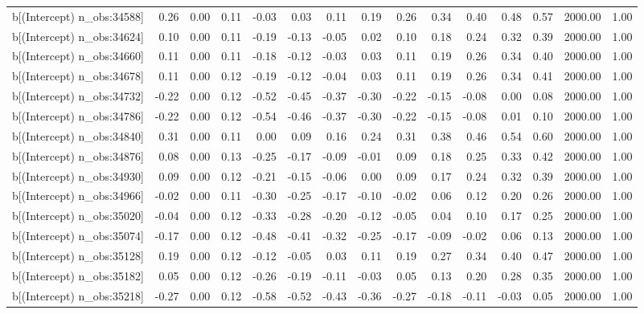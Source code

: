 \begin{table}[ht]
\begin{tabular}{rrrrrrrrrrrrrrr}
  b[(Intercept) n\_obs:34588] & 0.26 & 0.00 & 0.11 & -0.03 & 0.03 & 0.11 & 0.19 & 0.26 & 0.34 & 0.40 & 0.48 & 0.57 & 2000.00 & 1.00 \\ 
  b[(Intercept) n\_obs:34624] & 0.10 & 0.00 & 0.11 & -0.19 & -0.13 & -0.05 & 0.02 & 0.10 & 0.18 & 0.24 & 0.32 & 0.39 & 2000.00 & 1.00 \\ 
  b[(Intercept) n\_obs:34660] & 0.11 & 0.00 & 0.11 & -0.18 & -0.12 & -0.03 & 0.03 & 0.11 & 0.19 & 0.26 & 0.34 & 0.40 & 2000.00 & 1.00 \\ 
  b[(Intercept) n\_obs:34678] & 0.11 & 0.00 & 0.12 & -0.19 & -0.12 & -0.04 & 0.03 & 0.11 & 0.19 & 0.26 & 0.34 & 0.41 & 2000.00 & 1.00 \\ 
  b[(Intercept) n\_obs:34732] & -0.22 & 0.00 & 0.12 & -0.52 & -0.45 & -0.37 & -0.30 & -0.22 & -0.15 & -0.08 & 0.00 & 0.08 & 2000.00 & 1.00 \\ 
  b[(Intercept) n\_obs:34786] & -0.22 & 0.00 & 0.12 & -0.54 & -0.46 & -0.37 & -0.30 & -0.22 & -0.15 & -0.08 & 0.01 & 0.10 & 2000.00 & 1.00 \\ 
  b[(Intercept) n\_obs:34840] & 0.31 & 0.00 & 0.11 & 0.00 & 0.09 & 0.16 & 0.24 & 0.31 & 0.38 & 0.46 & 0.54 & 0.60 & 2000.00 & 1.00 \\ 
  b[(Intercept) n\_obs:34876] & 0.08 & 0.00 & 0.13 & -0.25 & -0.17 & -0.09 & -0.01 & 0.09 & 0.18 & 0.25 & 0.33 & 0.42 & 2000.00 & 1.00 \\ 
  b[(Intercept) n\_obs:34930] & 0.09 & 0.00 & 0.12 & -0.21 & -0.15 & -0.06 & 0.00 & 0.09 & 0.17 & 0.24 & 0.32 & 0.39 & 2000.00 & 1.00 \\ 
  b[(Intercept) n\_obs:34966] & -0.02 & 0.00 & 0.11 & -0.30 & -0.25 & -0.17 & -0.10 & -0.02 & 0.06 & 0.12 & 0.20 & 0.26 & 2000.00 & 1.00 \\ 
  b[(Intercept) n\_obs:35020] & -0.04 & 0.00 & 0.12 & -0.33 & -0.28 & -0.20 & -0.12 & -0.05 & 0.04 & 0.10 & 0.17 & 0.25 & 2000.00 & 1.00 \\ 
  b[(Intercept) n\_obs:35074] & -0.17 & 0.00 & 0.12 & -0.48 & -0.41 & -0.32 & -0.25 & -0.17 & -0.09 & -0.02 & 0.06 & 0.13 & 2000.00 & 1.00 \\ 
  b[(Intercept) n\_obs:35128] & 0.19 & 0.00 & 0.12 & -0.12 & -0.05 & 0.03 & 0.11 & 0.19 & 0.27 & 0.34 & 0.40 & 0.47 & 2000.00 & 1.00 \\ 
  b[(Intercept) n\_obs:35182] & 0.05 & 0.00 & 0.12 & -0.26 & -0.19 & -0.11 & -0.03 & 0.05 & 0.13 & 0.20 & 0.28 & 0.35 & 2000.00 & 1.00 \\ 
  b[(Intercept) n\_obs:35218] & -0.27 & 0.00 & 0.12 & -0.58 & -0.52 & -0.43 & -0.36 & -0.27 & -0.18 & -0.11 & -0.03 & 0.05 & 2000.00 & 1.00 \\ 

\end{tabular}
\end{table}
